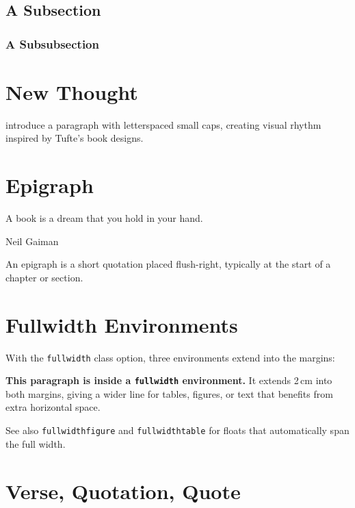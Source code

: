 \documentclass[sans,oneside,numeric,raggedright,fullwidth]{qbook}
\begin{document}
\subsection{A Subsection}

\lipsum[5]

\subsubsection{A Subsubsection}

\lipsum[6]

\section{New Thought}

 introduce a paragraph with letterspaced small
caps, creating visual rhythm inspired by Tufte's book designs.

\lipsum[7]

\section{Epigraph}

\epigraph{A book is a dream that you hold in your hand.}{Neil Gaiman}

An epigraph is a short quotation placed flush-right, typically at the
start of a chapter or section.

\section{Fullwidth Environments}

With the \texttt{fullwidth} class option, three environments extend into
the margins:

\begin{fullwidth}
  \textbf{This paragraph is inside a \texttt{fullwidth} environment.}
  It extends 2\,cm into both margins, giving a wider line for
  tables, figures, or text that benefits from extra horizontal space.
  \lipsum[8]
\end{fullwidth}

See also \texttt{fullwidthfigure} and \texttt{fullwidthtable} for floats
that automatically span the full width.

\section{Verse, Quotation, Quote}
\end{document}
